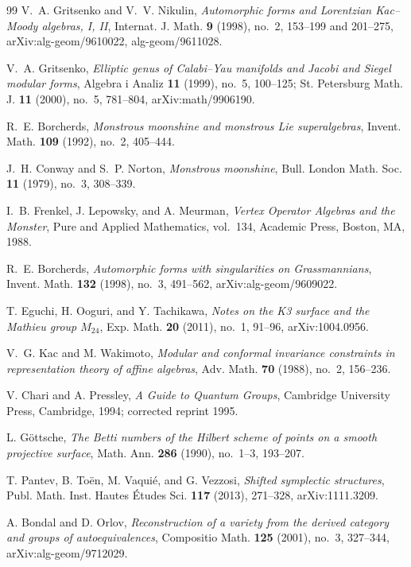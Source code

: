 \begin{thebibliography}{99}
V.~A. Gritsenko and V.~V. Nikulin, \emph{Automorphic forms and Lorentzian Kac--Moody algebras, I, II}, Internat. J. Math. \textbf{9} (1998), no.~2, 153--199 and 201--275, arXiv:alg-geom/9610022, alg-geom/9611028.

V.~A. Gritsenko, \emph{Elliptic genus of Calabi--Yau manifolds and Jacobi and Siegel modular forms}, Algebra i Analiz \textbf{11} (1999), no.~5, 100--125; St. Petersburg Math. J. \textbf{11} (2000), no.~5, 781--804, arXiv:math/9906190.

R.~E. Borcherds, \emph{Monstrous moonshine and monstrous Lie superalgebras}, Invent. Math. \textbf{109} (1992), no.~2, 405--444.

J.~H. Conway and S.~P. Norton, \emph{Monstrous moonshine}, Bull. London Math. Soc. \textbf{11} (1979), no.~3, 308--339.

I.~B. Frenkel, J. Lepowsky, and A. Meurman, \emph{Vertex Operator Algebras and the Monster}, Pure and Applied Mathematics, vol.~134, Academic Press, Boston, MA, 1988.

R.~E. Borcherds, \emph{Automorphic forms with singularities on Grassmannians}, Invent. Math. \textbf{132} (1998), no.~3, 491--562, arXiv:alg-geom/9609022.

T. Eguchi, H. Ooguri, and Y. Tachikawa, \emph{Notes on the K3 surface and the Mathieu group $M_{24}$}, Exp. Math. \textbf{20} (2011), no.~1, 91--96, arXiv:1004.0956.

V.~G. Kac and M. Wakimoto, \emph{Modular and conformal invariance constraints in representation theory of affine algebras}, Adv. Math. \textbf{70} (1988), no.~2, 156--236.

V. Chari and A. Pressley, \emph{A Guide to Quantum Groups}, Cambridge University Press, Cambridge, 1994; corrected reprint 1995.

L. G\"ottsche, \emph{The Betti numbers of the Hilbert scheme of points on a smooth projective surface}, Math. Ann. \textbf{286} (1990), no.~1--3, 193--207.

T. Pantev, B. To\"en, M. Vaqui\'e, and G. Vezzosi, \emph{Shifted symplectic structures}, Publ. Math. Inst. Hautes \'Etudes Sci. \textbf{117} (2013), 271--328, arXiv:1111.3209.

A. Bondal and D. Orlov, \emph{Reconstruction of a variety from the derived category and groups of autoequivalences}, Compositio Math. \textbf{125} (2001), no.~3, 327--344, arXiv:alg-geom/9712029.


\end{thebibliography}
